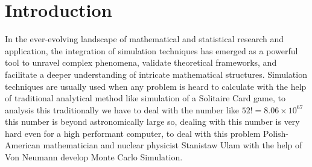 \chapter{Introduction}

In the ever-evolving landscape of mathematical and statistical research and application, 
the integration of simulation techniques has emerged as a powerful tool to unravel complex phenomena, validate theoretical frameworks, 
and facilitate a deeper understanding of intricate mathematical structures. 
Simulation techniques are usually used when any problem  is heard to calculate with the help of traditional analytical method
like simulation of a Solitaire Card game, to analysis this traditionally we have to deal with the number like $52! = 8.06\times 10^{67}$ 
this number is beyond astronomically large so, dealing with this number is very hard even for a high performant computer, to deal with this problem
Polish-American mathematician and nuclear physicist Stanistaw Ulam with the help of Von Neumann develop Monte Carlo Simulation.
